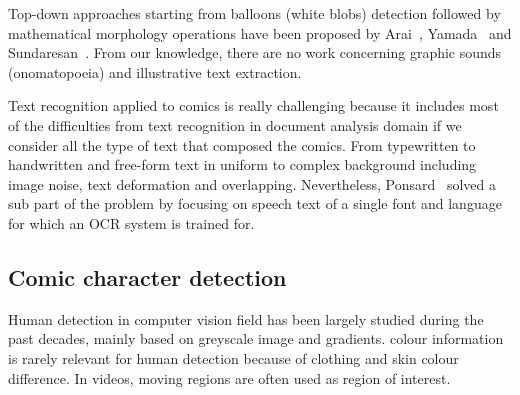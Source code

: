 Top-down approaches starting from balloons (white blobs) detection followed by mathematical morphology operations have been proposed by Arai~\cite{Arai11}, Yamada~\cite{Yam04} and Sundaresan~\cite{Sundaresan2012Text}.
From our knowledge, there are no work concerning graphic sounds (onomatopoeia) and illustrative text extraction.

Text recognition applied to comics is really challenging because it includes most of the difficulties from text recognition in document analysis domain if we consider all the type of text that composed the comics.
From typewritten to handwritten and free-form text in uniform to complex background including image noise, text deformation and overlapping.
Nevertheless, Ponsard~\cite{ponsard2012ocr} solved a sub part of the problem by focusing on speech text of a single font and language for which an OCR system is trained for.


\subsection{Comic character detection}
\label{sec:sota:comic_character}



Human detection in computer vision field has been largely studied during the past decades, mainly based on greyscale image and gradients. colour information is rarely relevant for human detection because of clothing and skin colour difference. In videos, moving regions are often used as region of interest.


